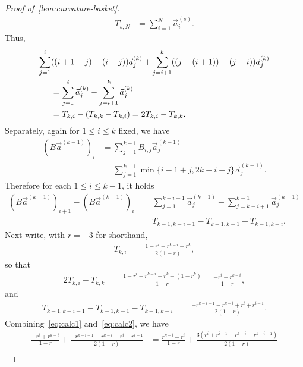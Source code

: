 \documentclass[11pt,a4paper]{article}
\begin{document}
\begin{proof}[Proof of~\cref{lem:curvature-basket}]
\begin{align*}
                T_{s, N} &= \sum_{i=1}^{N} \vec{a}^{(s)}_i.
            \end{align*}
        Thus,
            \begin{align}\label{eq:onesteppath}
                \sum_{j=1}^{i}& ((i+1 - j) - (i - j)) \vec{a}^{(k)}_{j} + \sum_{j=i+1}^{k} ((j - (i+1)) - (j - i)) \vec{a}^{(k)}_{j}\notag\\
                &= \sum_{j=1}^{i} \vec{a}^{(k)}_{j} - \sum_{j=i+1}^{k} \vec{a}^{(k)}_{j}\notag\\
                &= T_{k, i} - (T_{k, k} - T_{k, i}) = 2 T_{k, i} - T_{k, k}.
            \end{align}
        Separately, again for $1\leq i\leq k$ fixed, we have
            \begin{align*}
                ({B}\vec{a}^{(k-1)})_{i} &= \sum_{j=1}^{k-1} {B}_{i, j} \vec{a}^{(k-1)}_{j}\\
                &= \sum_{j=1}^{k-1} \min\{ i -1 +j , 2k-i-j \} \vec{a}^{(k-1)}_{j}.
            \end{align*}
        Therefore for each $1\leq i \leq k-1$, it holds
            \begin{align*}
                ({B}\vec{a}^{(k-1)})_{i+1} - ({B}\vec{a}^{(k-1)})_{i} &= \sum_{j=1}^{k-i-1} \vec{a}^{(k-1)}_{j} - \sum_{j=k - i+1}^{k-1} \vec{a}^{(k-1)}_{j}\\
                &= T_{k-1, k -i- 1} - T_{k-1, k-1} - T_{k-1, k-i}.
            \end{align*}    
        Next write, with $r=-3$ for shorthand,
            \begin{align}\label{eq:tki-exp}
                T_{k, i} &= \frac{1-r^{i} + r^{k-i} - r^{k}}{2(1-r)},
            \end{align}
        so that
            \begin{align}\label{eq:calc1}
                2 T_{k, i} - T_{k, k} &= \frac{1 - r^{i} + r^{k-i} - r^{k} - (1 - r^{k})}{1-r} = \frac{- r^{i} + r^{k-i}}{1-r},
            \end{align}
        and
            \begin{align}\label{eq:calc2}
                T_{k-1, k -i- 1} - T_{k-1, k-1} - T_{k-1, k-i} &= \frac{-r^{k-i-1} - r^{k-i} + r^{i} + r^{i-1}}{2(1-r)}.
            \end{align}
        Combining~\cref{eq:calc1} and~\cref{eq:calc2}, we have
            \begin{align*}
                \frac{- r^{i} + r^{k-i}}{1-r} + \frac{-r^{k-i-1} - r^{k-i} + r^{i} + r^{i-1}}{2(1-r)} &= \frac{r^{k-i} - r^{i}}{1-r} + \frac{3(r^{i} + r^{i-1} - r^{k-i} - r^{k-i-1} )}{2(1-r)}\\

\end{align*}
\end{proof}
\end{document}
